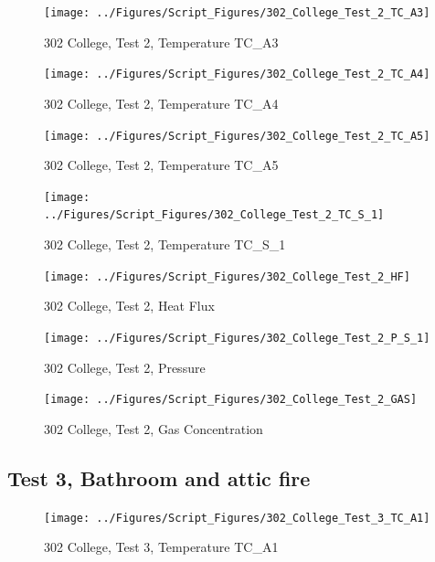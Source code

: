 \documentclass[12pt,oneside]{book}
\begin{document}
\begin{figure}[!ht]
\texttt{[image: ../Figures/Script\_Figures/302\_College\_Test\_2\_TC\_A3]}
\caption{302 College, Test 2, Temperature TC\_A3}
\label{fig:302_College_Test_2_TC_A3}
\end{figure}

\begin{figure}[!ht]
\texttt{[image: ../Figures/Script\_Figures/302\_College\_Test\_2\_TC\_A4]}
\caption{302 College, Test 2, Temperature TC\_A4}
\label{fig:302_College_Test_2_TC_A4}
\end{figure}

\begin{figure}[!ht]
\texttt{[image: ../Figures/Script\_Figures/302\_College\_Test\_2\_TC\_A5]}
\caption{302 College, Test 2, Temperature TC\_A5}
\label{fig:302_College_Test_2_TC_A5}
\end{figure}

\begin{figure}[!ht]
\texttt{[image: ../Figures/Script\_Figures/302\_College\_Test\_2\_TC\_S\_1]}
\caption{302 College, Test 2, Temperature TC\_S\_1}
\label{fig:302_College_Test_2_TC_S_1}
\end{figure}

\begin{figure}[!ht]
\texttt{[image: ../Figures/Script\_Figures/302\_College\_Test\_2\_HF]}
\caption{302 College, Test 2, Heat Flux}
\label{fig:302_College_Test_2_HF}
\end{figure}

\begin{figure}[!ht]
\texttt{[image: ../Figures/Script\_Figures/302\_College\_Test\_2\_P\_S\_1]}
\caption{302 College, Test 2, Pressure}
\label{fig:302_College_Test_2_P_S_1}
\end{figure}

\begin{figure}[!ht]
\texttt{[image: ../Figures/Script\_Figures/302\_College\_Test\_2\_GAS]}
\caption{302 College, Test 2, Gas Concentration}
\label{fig:302_College_Test_2_GAS}
\end{figure}


\clearpage


\subsection{Test 3, Bathroom and attic fire}

\begin{figure}[!ht]
\texttt{[image: ../Figures/Script\_Figures/302\_College\_Test\_3\_TC\_A1]}
\caption{302 College, Test 3, Temperature TC\_A1}
\label{fig:302_College_Test_3_TC_A1}
\end{figure}
\end{document}
